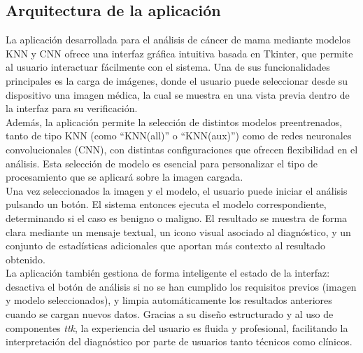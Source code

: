 \documentclass[12pt]{article} %
\begin{document}
\subsection{Arquitectura de la aplicación}
La aplicación desarrollada para el análisis de cáncer de mama mediante modelos KNN y CNN ofrece una interfaz gráfica intuitiva basada en Tkinter, que permite al usuario interactuar fácilmente con el sistema. Una de sus funcionalidades principales es la carga de imágenes, donde el usuario puede seleccionar desde su dispositivo una imagen médica, la cual se muestra en una vista previa dentro de la interfaz para su verificación.\\

Además, la aplicación permite la selección de distintos modelos preentrenados, tanto de tipo KNN (como “KNN(all)” o “KNN(aux)”) como de redes neuronales convolucionales (CNN), con distintas configuraciones que ofrecen flexibilidad en el análisis. Esta selección de modelo es esencial para personalizar el tipo de procesamiento que se aplicará sobre la imagen cargada.\\

Una vez seleccionados la imagen y el modelo, el usuario puede iniciar el análisis pulsando un botón. El sistema entonces ejecuta el modelo correspondiente, determinando si el caso es benigno o maligno. El resultado se muestra de forma clara mediante un mensaje textual, un icono visual asociado al diagnóstico, y un conjunto de estadísticas adicionales que aportan más contexto al resultado obtenido.\\

La aplicación también gestiona de forma inteligente el estado de la interfaz: desactiva el botón de análisis si no se han cumplido los requisitos previos (imagen y modelo seleccionados), y limpia automáticamente los resultados anteriores cuando se cargan nuevos datos. Gracias a su diseño estructurado y al uso de componentes \textit{ttk}, la experiencia del usuario es fluida y profesional, facilitando la interpretación del diagnóstico por parte de usuarios tanto técnicos como clínicos.\\
\end{document}
